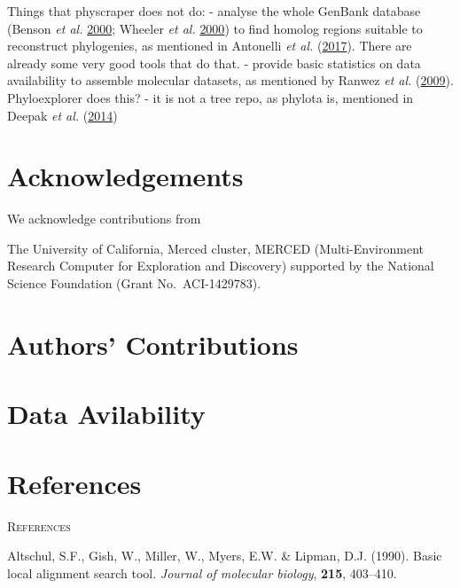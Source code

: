 \documentclass[]{article}
\begin{document}
Things that physcraper does not do:
- analyse the whole GenBank database (Benson \emph{et al.} \protect\hyperlink{ref-benson2000genbank}{2000}; Wheeler \emph{et al.} \protect\hyperlink{ref-wheeler2000database}{2000}) to find homolog regions suitable to reconstruct phylogenies, as mentioned in Antonelli \emph{et al.} (\protect\hyperlink{ref-antonelli2017toward}{2017}). There are already some very good tools that do that.
- provide basic statistics on data availability to assemble molecular datasets, as mentioned by Ranwez \emph{et al.} (\protect\hyperlink{ref-ranwez2009phyloexplorer}{2009}). Phyloexplorer does this?
- it is not a tree repo, as phylota is, mentioned in Deepak \emph{et al.} (\protect\hyperlink{ref-deepak2014evominer}{2014})

\hypertarget{acknowledgements}{%
\section{Acknowledgements}\label{acknowledgements}}

We acknowledge contributions from

The University of California, Merced cluster, MERCED (Multi-Environment Research Computer for Exploration and Discovery) supported by the National Science Foundation (Grant No.~ACI-1429783).

\hypertarget{authors-contributions}{%
\section{Authors' Contributions}\label{authors-contributions}}

\hypertarget{data-avilability}{%
\section{Data Avilability}\label{data-avilability}}

\hypertarget{references}{%
\section{References}\label{references}}

\newpage
\begin{center}
\textsc{References}
\end{center}

\hypertarget{refs}{}
\leavevmode\hypertarget{ref-altschul1990basic}{}%
Altschul, S.F., Gish, W., Miller, W., Myers, E.W. \& Lipman, D.J. (1990). Basic local alignment search tool. \emph{Journal of molecular biology}, \textbf{215}, 403--410.
\end{document}
